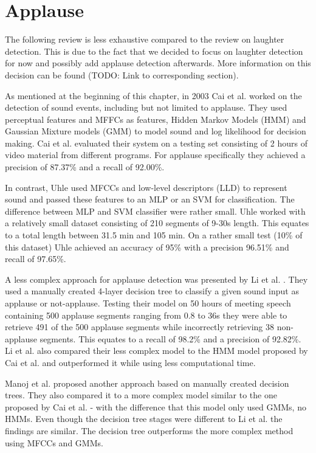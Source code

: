 \documentclass[bsc,frontabs,parskip,deptreport]{infthesis}
\begin{document}
\section{Applause}
The following review is less exhaustive compared to the review on laughter detection.
This is due to the fact that we decided to focus on laughter detection for now and possibly add applause detection afterwards.
More information on this decision can be found (TODO: Link to corresponding section).

As mentioned at the beginning of this chapter, in 2003 Cai et al. \cite{cai2003highlight} worked on the detection of sound events, including but not limited to applause.
They used perceptual features and MFFCs as features, Hidden Markov Models (HMM) and Gaussian Mixture models (GMM) to model sound and log likelihood for decision making.
Cai et al. evaluated their system on a testing set consisting of 2 hours of video material from different programs.
For applause specifically they achieved a precision of 87.37\% and a recall of 92.00\%.

In contrast, Uhle \cite{uhle2011applause} used MFCCs and low-level descriptors (LLD) to represent sound and passed these features to an MLP or an SVM for classification.
The difference between MLP and SVM classifier were rather small.
Uhle worked with a relatively small dataset consisting of 210 segments of 9-30s length. This equates to a total length between 31.5 min and 105 min.
On a rather small test (10\% of this dataset) Uhle achieved an accuracy of 95\% with a precision 96.51\% and recall of 97.65\%.

A less complex approach for applause detection was presented by Li et al. \cite{li2009characteristics}.
They used a manually created 4-layer decision tree to classify a given sound input as applause or not-applause.
Testing their model on 50 hours of meeting speech containing 500 applause segments ranging from 0.8 to 36s they were able to retrieve 491 of the 500 applause segments while incorrectly retrieving 38 non-applause segments.
This equates to a recall of 98.2\% and a precision of 92.82\%. Li et al. also compared their less complex model to the HMM model proposed by Cai et al.\cite{cai2003highlight} and outperformed it while using less computational time.

Manoj et al. \cite{manoj2011novel} proposed another approach based on manually created decision trees. They also compared it to a more complex model similar to the one proposed by Cai et al. \cite{cai2003highlight} - with the difference that this model only used GMMs, no HMMs.
Even though the decision tree stages were different to Li et al. \cite{li2009characteristics} the findings are similar. The decision tree outperforms the more complex method using MFCCs and GMMs.  
\end{document}
